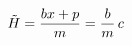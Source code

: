 \documentclass[preview]{standalone}
\begin{document}
\begin{align*}
\special{dvisvgm:raw <g id='unique000'>}\tilde H=\frac{bx+p}{m}=\frac bm\,c\special{dvisvgm:raw </g>}
\end{align*}
\end{document}
